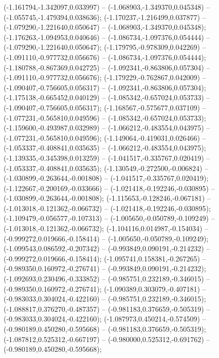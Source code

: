  (-1.161794,-1.342097,0.033997) -- (-1.068903,-1.349370,0.045348) -- (-1.055745,-1.479394,0.038636);
 (-1.170237,-1.216499,0.037877) -- (-1.079290,-1.221640,0.050647) -- (-1.068903,-1.349370,0.045348);
 (-1.176263,-1.094953,0.040646) -- (-1.086734,-1.097376,0.054444) -- (-1.079290,-1.221640,0.050647);
 (-1.179795,-0.978309,0.042269) -- (-1.091110,-0.977732,0.056676) -- (-1.086734,-1.097376,0.054444);
 (-1.180788,-0.867369,0.042725) -- (-1.092341,-0.863806,0.057304) -- (-1.091110,-0.977732,0.056676);
 (-1.179229,-0.762867,0.042009) -- (-1.090407,-0.756605,0.056317) -- (-1.092341,-0.863806,0.057304);
 (-1.175138,-0.665452,0.040129) -- (-1.085342,-0.657024,0.053733) -- (-1.090407,-0.756605,0.056317);
 (-1.168567,-0.575677,0.037109) -- (-1.077231,-0.565810,0.049596) -- (-1.085342,-0.657024,0.053733);
 (-1.159600,-0.493987,0.032989) -- (-1.066212,-0.483554,0.043975) -- (-1.077231,-0.565810,0.049596);
 (-1.149064,-0.419031,0.026466) -- (-1.053337,-0.408841,0.035635) -- (-1.066212,-0.483554,0.043975);
 (-1.139335,-0.345398,0.013259) -- (-1.041517,-0.335767,0.020419) -- (-1.053337,-0.408841,0.035635);
 (-1.130549,-0.272500,-0.006824) -- (-1.030899,-0.263644,-0.001808) -- (-1.041517,-0.335767,0.020419);
 (-1.122667,-0.200169,-0.033666) -- (-1.021418,-0.192246,-0.030895) -- (-1.030899,-0.263644,-0.001808);
 (-1.115653,-0.128246,-0.067181) -- (-1.013018,-0.121362,-0.066732) -- (-1.021418,-0.192246,-0.030895);
 (-1.109479,-0.056577,-0.107313) -- (-1.005650,-0.050789,-0.109249) -- (-1.013018,-0.121362,-0.066732);
 (-1.104116,0.014987,-0.154034) -- (-0.999272,0.019666,-0.158414) -- (-1.005650,-0.050789,-0.109249);
 (-1.099543,0.086592,-0.207342) -- (-0.993849,0.090191,-0.214232) -- (-0.999272,0.019666,-0.158414);
 (-1.095741,0.158381,-0.267265) -- (-0.989350,0.160972,-0.276741) -- (-0.993849,0.090191,-0.214232);
 (-1.092693,0.230496,-0.333852) -- (-0.985751,0.232189,-0.346015) -- (-0.989350,0.160972,-0.276741);
 (-1.090389,0.303079,-0.407181) -- (-0.983033,0.304024,-0.422160) -- (-0.985751,0.232189,-0.346015);
 (-1.088817,0.376270,-0.487357) -- (-0.981183,0.376659,-0.505319) -- (-0.983033,0.304024,-0.422160);
 (-1.087973,0.450214,-0.574509) -- (-0.980189,0.450280,-0.595668) -- (-0.981183,0.376659,-0.505319);
 (-1.087812,0.525312,-0.667197) -- (-0.980000,0.525312,-0.691762) -- (-0.980189,0.450280,-0.595668);
